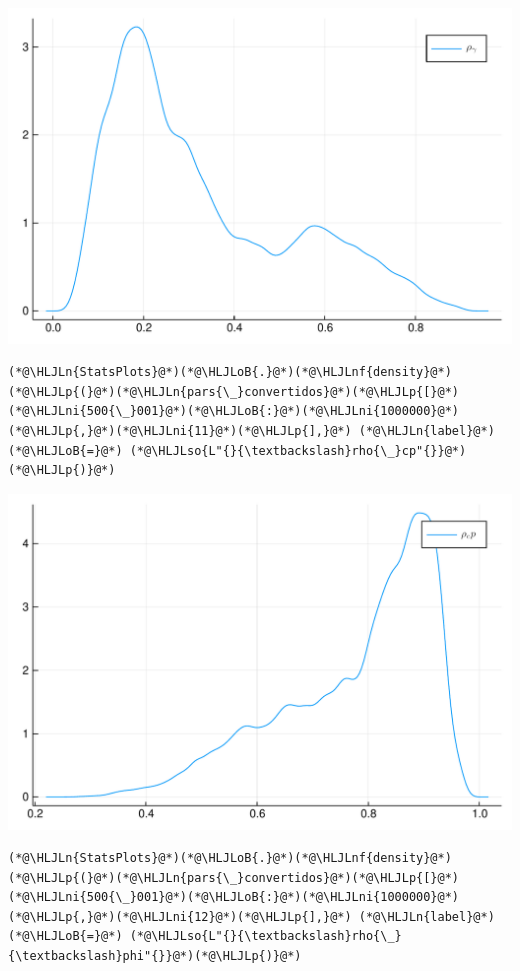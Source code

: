 \documentclass[12pt,a4paper]{article}
\newcommand{\HLJLn}[1]{#1}
\newcommand{\HLJLnf}[1]{\textcolor[RGB]{66,102,213}{#1}}
\newcommand{\HLJLso}[1]{\textcolor[RGB]{201,61,57}{#1}}
\newcommand{\HLJLni}[1]{\textcolor[RGB]{59,151,46}{#1}}
\newcommand{\HLJLoB}[1]{\textcolor[RGB]{102,102,102}{\textbf{#1}}}
\newcommand{\HLJLp}[1]{#1}
\begin{document}
\includegraphics[width=\linewidth]{figures/carlos_mcmc_11_1.pdf}

\begin{lstlisting}
(*@\HLJLn{StatsPlots}@*)(*@\HLJLoB{.}@*)(*@\HLJLnf{density}@*)(*@\HLJLp{(}@*)(*@\HLJLn{pars{\_}convertidos}@*)(*@\HLJLp{[}@*)(*@\HLJLni{500{\_}001}@*)(*@\HLJLoB{:}@*)(*@\HLJLni{1000000}@*)(*@\HLJLp{,}@*)(*@\HLJLni{11}@*)(*@\HLJLp{],}@*) (*@\HLJLn{label}@*)(*@\HLJLoB{=}@*) (*@\HLJLso{L"{}{\textbackslash}rho{\_}cp"{}}@*)(*@\HLJLp{)}@*)
\end{lstlisting}

\includegraphics[width=\linewidth]{figures/carlos_mcmc_12_1.pdf}

\begin{lstlisting}
(*@\HLJLn{StatsPlots}@*)(*@\HLJLoB{.}@*)(*@\HLJLnf{density}@*)(*@\HLJLp{(}@*)(*@\HLJLn{pars{\_}convertidos}@*)(*@\HLJLp{[}@*)(*@\HLJLni{500{\_}001}@*)(*@\HLJLoB{:}@*)(*@\HLJLni{1000000}@*)(*@\HLJLp{,}@*)(*@\HLJLni{12}@*)(*@\HLJLp{],}@*) (*@\HLJLn{label}@*)(*@\HLJLoB{=}@*) (*@\HLJLso{L"{}{\textbackslash}rho{\_}{\textbackslash}phi"{}}@*)(*@\HLJLp{)}@*)
\end{lstlisting}
\end{document}
